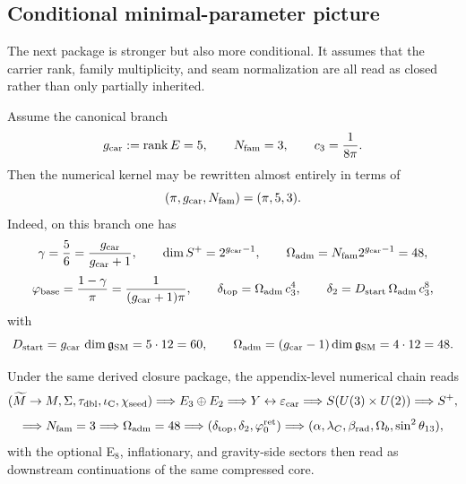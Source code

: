 \subsection{Conditional minimal-parameter picture}

The next package is stronger but also more conditional. It assumes that the carrier rank, family multiplicity, and seam normalization are all read as closed rather than only partially inherited.

\begin{principle}
Assume the canonical branch
\[
g_{\mathrm{car}}:=\operatorname{rank} E=5,
\qquad
N_{\mathrm{fam}}=3,
\qquad
c_3=\frac{1}{8\pi}.
\]
Then the numerical kernel may be rewritten almost entirely in terms of
\[
(\pi,g_{\mathrm{car}},N_{\mathrm{fam}})=(\pi,5,3).
\]
Indeed, on this branch one has
\[
\gamma=\frac56=\frac{g_{\mathrm{car}}}{g_{\mathrm{car}}+1},
\qquad
\dim S^+=2^{g_{\mathrm{car}}-1},
\qquad
\Omega_{\mathrm{adm}}=N_{\mathrm{fam}}2^{g_{\mathrm{car}}-1}=48,
\]
\[
\varphi_{\mathrm{base}}=\frac{1-\gamma}{\pi}=\frac{1}{(g_{\mathrm{car}}+1)\pi},
\qquad
\delta_{\mathrm{top}}=\Omega_{\mathrm{adm}}\,c_3^4,
\qquad
\delta_2=D_{\mathrm{start}}\,\Omega_{\mathrm{adm}}\,c_3^8,
\]
with
\[
D_{\mathrm{start}}=g_{\mathrm{car}}\,\dim\mathfrak g_{\mathrm{SM}}=5\cdot 12=60,
\qquad
\Omega_{\mathrm{adm}}=(g_{\mathrm{car}}-1)\dim\mathfrak g_{\mathrm{SM}}=4\cdot 12=48.
\]
\end{principle}

\begin{remark}
Under the same derived closure package, the appendix-level numerical chain reads
\[
(\widetilde M\to M,\Sigma,\tau_{\mathrm{dbl}},\iota_{\mathrm C},\chi_{\mathrm{seed}})
\Longrightarrow
E_3\oplus E_2
\Longrightarrow
Y \leftrightarrow \varepsilon_{\mathrm{car}}
\Longrightarrow
S(U(3)\times U(2))
\Longrightarrow
S^+,
\]
\[
\Longrightarrow
N_{\mathrm{fam}}=3
\Longrightarrow
\Omega_{\mathrm{adm}}=48
\Longrightarrow
(\delta_{\mathrm{top}},\delta_2,\varphi_0^{\mathrm{ret}})
\Longrightarrow
(\alpha,\lambda_C,\beta_{\mathrm{rad}},\Omega_b,\sin^2\theta_{13}),
\]
with the optional E$_8$, inflationary, and gravity-side sectors then read as downstream continuations of the same compressed core.
\end{remark}

